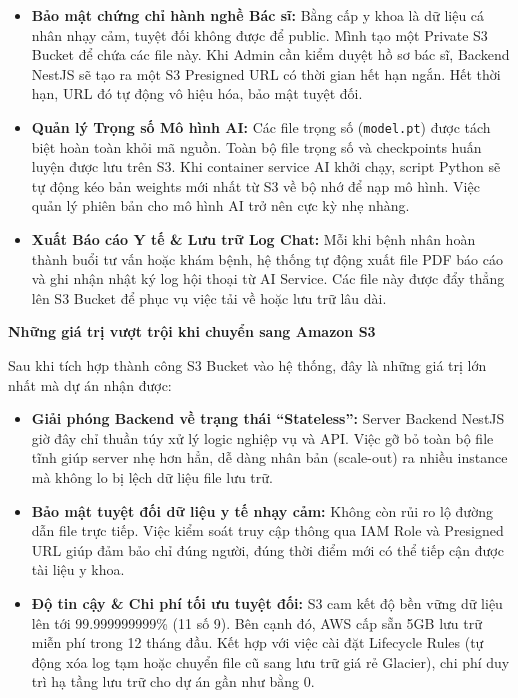 \begin{itemize}
\tightlist
\item
  \textbf{Bảo mật chứng chỉ hành nghề Bác sĩ:} Bằng cấp y khoa là dữ
  liệu cá nhân nhạy cảm, tuyệt đối không được để public. Mình tạo một
  Private S3 Bucket để chứa các file này. Khi Admin cần kiểm duyệt hồ sơ
  bác sĩ, Backend NestJS sẽ tạo ra một S3 Presigned URL có thời gian hết
  hạn ngắn. Hết thời hạn, URL đó tự động vô hiệu hóa, bảo mật tuyệt đối.
\item
  \textbf{Quản lý Trọng số Mô hình AI:} Các file trọng số
  (\texttt{model.pt}) được tách biệt hoàn toàn khỏi mã nguồn. Toàn bộ
  file trọng số và checkpoints huấn luyện được lưu trên S3. Khi
  container service AI khởi chạy, script Python sẽ tự động kéo bản
  weights mới nhất từ S3 về bộ nhớ để nạp mô hình. Việc quản lý phiên
  bản cho mô hình AI trở nên cực kỳ nhẹ nhàng.
\item
  \textbf{Xuất Báo cáo Y tế \& Lưu trữ Log Chat:} Mỗi khi bệnh nhân hoàn
  thành buổi tư vấn hoặc khám bệnh, hệ thống tự động xuất file PDF báo
  cáo và ghi nhận nhật ký log hội thoại từ AI Service. Các file này được
  đẩy thẳng lên S3 Bucket để phục vụ việc tải về hoặc lưu trữ lâu dài.
\end{itemize}

\vspace{0.5em}\noindent\textbf{Những giá trị vượt trội khi chuyển sang Amazon S3}

Sau khi tích hợp thành công S3 Bucket vào hệ thống, đây là những giá trị
lớn nhất mà dự án nhận được:

\begin{itemize}
\tightlist
\item
  \textbf{Giải phóng Backend về trạng thái ``Stateless'':} Server
  Backend NestJS giờ đây chỉ thuần túy xử lý logic nghiệp vụ và API.
  Việc gỡ bỏ toàn bộ file tĩnh giúp server nhẹ hơn hẳn, dễ dàng nhân bản
  (scale-out) ra nhiều instance mà không lo bị lệch dữ liệu file lưu
  trữ.
\item
  \textbf{Bảo mật tuyệt đối dữ liệu y tế nhạy cảm:} Không còn rủi ro lộ
  đường dẫn file trực tiếp. Việc kiểm soát truy cập thông qua IAM Role
  và Presigned URL giúp đảm bảo chỉ đúng người, đúng thời điểm mới có
  thể tiếp cận được tài liệu y khoa.
\item
  \textbf{Độ tin cậy \& Chi phí tối ưu tuyệt đối:} S3 cam kết độ bền
  vững dữ liệu lên tới 99.999999999\% (11 số 9). Bên cạnh đó, AWS cấp
  sẵn 5GB lưu trữ miễn phí trong 12 tháng đầu. Kết hợp với việc cài đặt
  Lifecycle Rules (tự động xóa log tạm hoặc chuyển file cũ sang lưu trữ
  giá rẻ Glacier), chi phí duy trì hạ tầng lưu trữ cho dự án gần như
  bằng 0.
\end{itemize}

